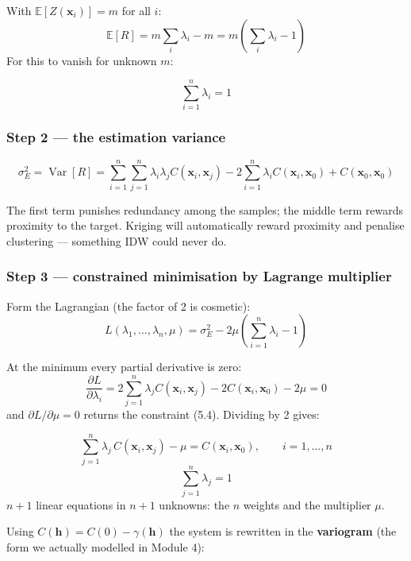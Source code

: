 \documentclass[11pt]{article}
\begin{document}
With $\mathbb{E}[Z(\mathbf{x}_i)]=m$ for all $i$:
\[ \mathbb{E}[R]=m\sum_i\lambda_i-m=m\left(\sum_i\lambda_i-1\right) \]
For this to vanish for unknown $m$:

\begin{eqbox}
\[ \sum_{i=1}^{n}\lambda_i = 1 \tag{5.4}\]
\end{eqbox}

\subsubsection*{Step 2 --- the estimation variance}

\begin{eqbox}
\[ \sigma_E^{2}=\operatorname{Var}[R]=
   \sum_{i=1}^{n}\sum_{j=1}^{n}\lambda_i\lambda_j
   C(\mathbf{x}_i,\mathbf{x}_j)
   -2\sum_{i=1}^{n}\lambda_i C(\mathbf{x}_i,\mathbf{x}_0)
   +C(\mathbf{x}_0,\mathbf{x}_0) \tag{5.5}\]
\end{eqbox}

The first term punishes redundancy among the samples; the middle term
rewards proximity to the target. Kriging will automatically reward
proximity and penalise clustering --- something IDW could never do.

\subsubsection*{Step 3 --- constrained minimisation by Lagrange multiplier}

Form the Lagrangian (the factor of 2 is cosmetic):
\[ L(\lambda_1,\dots,\lambda_n,\mu)=\sigma_E^{2}
   -2\mu\left(\sum_{i=1}^{n}\lambda_i-1\right) \tag{5.6}\]

At the minimum every partial derivative is zero:
\[ \frac{\partial L}{\partial\lambda_i}
   =2\sum_{j=1}^{n}\lambda_j C(\mathbf{x}_i,\mathbf{x}_j)
   -2C(\mathbf{x}_i,\mathbf{x}_0)-2\mu=0 \]
and $\partial L/\partial\mu=0$ returns the constraint (5.4). Dividing by
2 gives:

\begin{keybox}
\[ \sum_{j=1}^{n}\lambda_j\,C(\mathbf{x}_i,\mathbf{x}_j)-\mu
   =C(\mathbf{x}_i,\mathbf{x}_0),\qquad i=1,\dots,n \]
\[ \sum_{j=1}^{n}\lambda_j=1 \]
$n+1$ linear equations in $n+1$ unknowns: the $n$ weights and the
multiplier $\mu$.
\end{keybox}

Using $C(\mathbf{h})=C(0)-\gamma(\mathbf{h})$ the system is rewritten in
the \textbf{variogram} (the form we actually modelled in Module 4):
\end{document}
